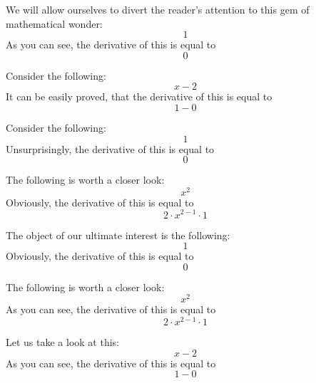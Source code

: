 \documentclass{article}
\begin{document}
We will allow ourselves to divert the reader's attention to this gem of mathematical wonder:
\begin{equation}
1 
\end{equation}
As you can see, the derivative of this is equal to
\begin{equation}
0 
\end{equation}

Consider the following:
\begin{equation}
x - 2 
\end{equation}
It can be easily proved, that the derivative of this is equal to
\begin{equation}
1 - 0 
\end{equation}

Consider the following:
\begin{equation}
1 
\end{equation}
Unsurprisingly, the derivative of this is equal to
\begin{equation}
0 
\end{equation}

The following is worth a closer look:
\begin{equation}
x ^{2 } 
\end{equation}
Obviously, the derivative of this is equal to
\begin{equation}
2 \cdot x ^{2 - 1 } \cdot 1 
\end{equation}

The object of our ultimate interest is the following:
\begin{equation}
1 
\end{equation}
Obviously, the derivative of this is equal to
\begin{equation}
0 
\end{equation}

The following is worth a closer look:
\begin{equation}
x ^{2 } 
\end{equation}
As you can see, the derivative of this is equal to
\begin{equation}
2 \cdot x ^{2 - 1 } \cdot 1 
\end{equation}

Let us take a look at this:
\begin{equation}
x - 2 
\end{equation}
As you can see, the derivative of this is equal to
\begin{equation}
1 - 0 
\end{equation}
\end{document}
